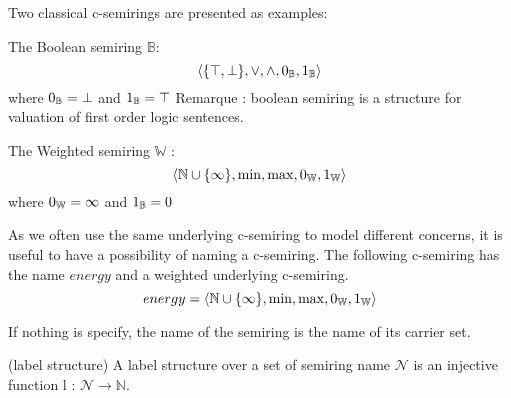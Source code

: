 Two classical c-semirings are presented as examples:
\begin{list}{-}{}
	\item The Boolean semiring $\mathbb{B}$:
		$$\left\langle \{\top,\bot\}, \lor, \land, \boldmath{0}_{\mathbb{B}}, \boldmath{1}_{\mathbb{B}} \right\rangle$$ where $\boldmath{0}_{\mathbb{B}}=\bot$ and $\boldmath{1}_{\mathbb{B}}=\top$
	Remarque : boolean semiring is a structure for valuation of first order logic sentences.

	\item The Weighted semiring $\mathbb{W}$ :
		$$\left\langle \mathbb{N}\cup\{\infty\}, \min, \max, \boldmath{0}_{\mathbb{W}}, \boldmath{1}_{\mathbb{W}} \right\rangle$$ where $\boldmath{0}_{\mathbb{W}}=\infty$ and $\boldmath{1}_{\mathbb{B}}=0$	
\end{list}



As we often use the same underlying c-semiring to model different concerns, it is useful to have a possibility of naming a c-semiring. The following c-semiring has the name $energy$ and a weighted underlying c-semiring.
$$energy = \left\langle \mathbb{N}\cup\{\infty\}, \min, \max, \boldmath{0}_{\mathbb{W}}, \boldmath{1}_{\mathbb{W}} \right\rangle
$$

If nothing is specify, the name of the semiring is the name of its carrier set.

\begin{definition} (label structure)
	A label structure over a set of semiring name $\mathcal{N}$ is an injective function l : $\mathcal{N} \rightarrow \mathbb{N}$. 
\end{definition}



